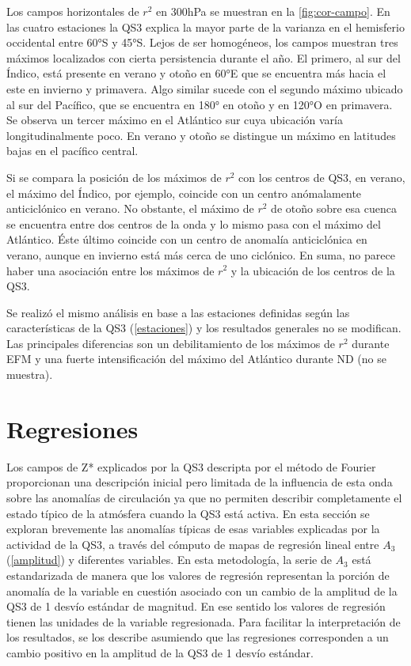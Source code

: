 \documentclass[spanish,a4paper,12pt,oneside]{book}
\begin{document}
Los campos horizontales de \(r^2\) en 300hPa se muestran en la
\autoref{fig:cor-campo}. En las cuatro estaciones la QS3 explica la
mayor parte de la varianza en el hemisferio occidental entre 60°S y
45°S. Lejos de ser homogéneos, los campos muestran tres máximos
localizados con cierta persistencia durante el año. El primero, al sur
del Índico, está presente en verano y otoño en 60°E que se encuentra más
hacia el este en invierno y primavera. Algo similar sucede con el
segundo máximo ubicado al sur del Pacífico, que se encuentra en 180° en
otoño y en 120°O en primavera. Se observa un tercer máximo en el
Atlántico sur cuya ubicación varía longitudinalmente poco. En verano y
otoño se distingue un máximo en latitudes bajas en el pacífico central.

Si se compara la posición de los máximos de \(r^2\) con los centros de
QS3, en verano, el máximo del Índico, por ejemplo, coincide con un
centro anómalamente anticiclónico en verano. No obstante, el máximo de
\(r^2\) de otoño sobre esa cuenca se encuentra entre dos centros de la
onda y lo mismo pasa con el máximo del Atlántico. Éste último coincide
con un centro de anomalía anticiclónica en verano, aunque en invierno
está más cerca de uno ciclónico. En suma, no parece haber una asociación
entre los máximos de \(r^2\) y la ubicación de los centros de la QS3.

Se realizó el mismo análisis en base a las estaciones definidas según
las características de la QS3 (\autoref{estaciones}) y los resultados
generales no se modifican. Las principales diferencias son un
debilitamiento de los máximos de \(r^2\) durante EFM y una fuerte
intensificación del máximo del Atlántico durante ND (no se muestra).

\section{Regresiones}\label{regresiones}

Los campos de Z* explicados por la QS3 descripta por el método de
Fourier proporcionan una descripción inicial pero limitada de la
influencia de esta onda sobre las anomalías de circulación ya que no
permiten describir completamente el estado típico de la atmósfera cuando
la QS3 está activa. En esta sección se exploran brevemente las anomalías
típicas de esas variables explicadas por la actividad de la QS3, a
través del cómputo de mapas de regresión lineal entre \(A_3\)
(\autoref{amplitud}) y diferentes variables. En esta metodología, la
serie de \(A_3\) está estandarizada de manera que los valores de
regresión representan la porción de anomalía de la variable en cuestión
asociado con un cambio de la amplitud de la QS3 de 1 desvío estándar de
magnitud. En ese sentido los valores de regresión tienen las unidades de
la variable regresionada. Para facilitar la interpretación de los
resultados, se los describe asumiendo que las regresiones corresponden a
un cambio positivo en la amplitud de la QS3 de 1 desvío estándar.
\end{document}
